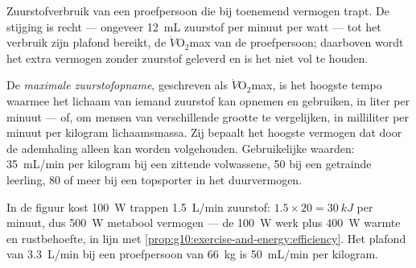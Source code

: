 \begin{omfigure}

{\small Zuurstofverbruik van een proefpersoon die bij toenemend vermogen
trapt. De stijging is recht --- ongeveer \qty{12}{mL} zuurstof per minuut
per watt --- tot het verbruik zijn plafond bereikt, de
$\dot V\!\mathrm{O_2}$max van de proefpersoon; daarboven wordt het extra
vermogen zonder zuurstof geleverd en is het niet vol te houden.}
\end{omfigure}

\begin{definition}\label{def:g10:exercise-and-energy:vo2max}
De \emph{maximale zuurstofopname},
geschreven als $\dot V\!\mathrm{O_2}$max, is het hoogste tempo waarmee
het lichaam van iemand zuurstof kan opnemen en gebruiken, in liter per
minuut --- of, om mensen van verschillende grootte te vergelijken, in
milliliter per minuut per kilogram lichaamsmassa. Zij bepaalt het
hoogste vermogen dat door de ademhaling alleen kan worden volgehouden.
Gebruikelijke waarden: \qty{35}{mL/min} per kilogram bij een zittende
volwassene, \num{50} bij een getrainde leerling, \num{80} of meer bij een
topsporter in het duurvermogen.
\end{definition}

\begin{example}\label{ex:g10:exercise-and-energy:reading}
In de figuur kost \qty{100}{W} trappen \qty{1.5}{L/min} zuurstof:
$1.5 \times 20 = \qty{30}{kJ}$ per minuut, dus \qty{500}{W} metabool
vermogen --- de \qty{100}{W} werk plus \qty{400}{W} warmte en
rustbehoefte, in lijn met
\cref{prop:g10:exercise-and-energy:efficiency}. Het plafond van
\qty{3.3}{L/min} bij een proefpersoon van \qty{66}{kg} is
\qty{50}{mL/min} per kilogram.
\end{example}

